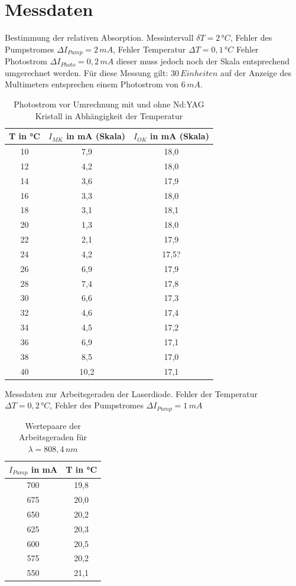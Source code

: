 \documentclass[twoside,colorback,accentcolor=tud4c,11pt]{tudreport}
\begin{document}
\chapter{Messdaten}
Bestimmung der relativen Absorption. Messintervall $\delta T=2\,\si{°C}$, Fehler des Pumpstromes $\Delta I_{Pump}=2\,\si{mA}$, Fehler Temperatur $\Delta T=0,1\,\si{°C}$ Fehler Photostrom $\Delta I_{Photo}=0,2\,\si{mA}$ dieser muss jedoch noch der Skala entsprechend umgerechnet werden. Für diese Messung gilt: $30\,\si{Einheiten}$ auf der Anzeige des Multimeters entsprechen einem Photostrom von $6\,\si{mA}$.
\begin{table}[H]
\renewcommand*{\arraystretch}{1.2}
\centering
\begin{tabular}{|c|c|c|}
\hline 
T in °C & $I_{MK}$ in mA (Skala) & $I_{OK}$ in mA (Skala)\\
\hline 
10 & 7,9 & 18,0 \\ 
\hline 
12 & 4,2 & 18,0 \\ 
\hline 
14 & 3,6 & 17,9 \\ 
\hline 
16 & 3,3 & 18,0 \\ 
\hline 
18 & 3,1 & 18,1 \\ 
\hline
20 & 1,3 & 18,0 \\ 
\hline
22 & 2,1 & 17,9 \\ 
\hline
24 & 4,2 & 17,5? \\ 
\hline
26 & 6,9 & 17,9 \\ 
\hline
28 & 7,4 & 17,8 \\ 
\hline
30 & 6,6 & 17,3 \\ 
\hline
32 & 4,6 & 17,4 \\ 
\hline
34 & 4,5 & 17,2 \\ 
\hline
36 & 6,9 & 17,1 \\ 
\hline
38 & 8,5 & 17,0 \\ 
\hline
40 & 10,2 & 17,1 \\ 
\hline
\end{tabular} 
\caption{Photostrom vor Umrechnung mit und ohne Nd:YAG Kristall in Abhängigkeit der Temperatur}\label{relabs}
\end{table}

Messdaten zur Arbeitsgeraden der Laserdiode. Fehler der Temperatur $\Delta T=0,2\,\si{°C}$, Fehler des Pumpstromes $\Delta I_{Pump}=1\,\si{mA}$

\begin{table}[H]
\renewcommand*{\arraystretch}{1.2}
\centering
\begin{tabular}{|c|c|}
\hline 
$I_{Pump}$ in mA & T in °C\\
\hline 
700 & 19,8  \\ 
\hline 
675 & 20,0  \\ 
\hline 
650 & 20,2  \\ 
\hline 
625 & 20,3  \\ 
\hline 
600 & 20,5  \\ 
\hline
575 & 20,2 \\ 
\hline
550 & 21,1 \\ 
\hline
\end{tabular} 
\caption{Wertepaare der Arbeitsgeraden für $\lambda =808,4\,\si{nm}$}\label{arbger}
\end{table}
\end{document}
